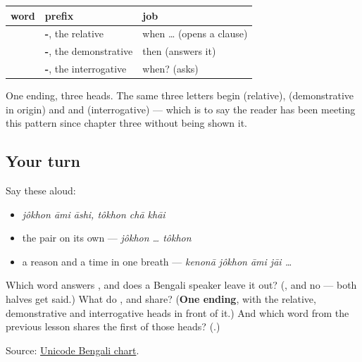 \begin{grammarlens}[title={Grammar Lens: one frame, three prefixes}]
\noindent
\begin{tabularx}{\linewidth}{@{}>{\raggedright\arraybackslash}X>{\raggedright\arraybackslash}X>{\raggedright\arraybackslash}X@{}}
\toprule
\textbf{word} & \textbf{prefix} & \textbf{job} \\
\midrule
\textbf{\bn{যখন}} & \textbf{\bn{য}-}, the relative & when … (opens a clause) \\
\textbf{\bn{তখন}} & \textbf{\bn{ত}-}, the demonstrative & then (answers it) \\
\textbf{\bn{কখন}} & \textbf{\bn{ক}-}, the interrogative & when? (asks) \\
\bottomrule
\end{tabularx}

One ending, three heads. The same three letters begin \textbf{} (relative), \textbf{} (demonstrative in origin) and \textbf{} and \textbf{} (interrogative) — which is to say the reader has been meeting this pattern since chapter three without being shown it.
\end{grammarlens}

\subsection*{Your turn}
Say these aloud:

\begin{itemize}
\raggedright
  \item \emph{jôkhon āmi āshi, tôkhon chā khāi}
  \item the pair on its own — \emph{jôkhon … tôkhon}
  \item a reason and a time in one breath — \emph{kenonā jôkhon āmi jāi …}
\end{itemize}

\begin{tcolorbox}[breakable,colback=teal!4,colframe=teal!35!black,title={Before you move on}]
Which word answers \textbf{}, and does a Bengali speaker leave it out? (\textbf{}, and no — both halves get said.) What do \textbf{}, \textbf{} and \textbf{} share? (\textbf{One ending}, with the relative, demonstrative and interrogative heads in front of it.) And which word from the previous lesson shares the first of those heads? (\textbf{}.)

Source: \href{https://www.unicode.org/charts/PDF/U0980.pdf}{Unicode Bengali chart}.
\end{tcolorbox}

